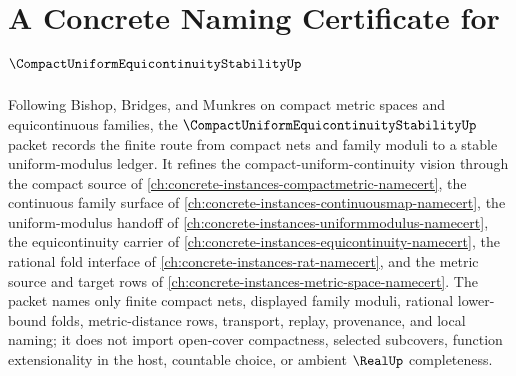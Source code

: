 \chapter{A Concrete Naming Certificate for $\CompactUniformEquicontinuityStabilityUp$}
\label{ch:concrete-instances-compact-uniform-equicontinuity-stability-namecert}

Following Bishop, Bridges, and Munkres on compact metric spaces and equicontinuous families, the $\CompactUniformEquicontinuityStabilityUp$ packet records the finite route from compact nets and family moduli to a stable uniform-modulus ledger. It refines the compact-uniform-continuity vision through the compact source of \autoref{ch:concrete-instances-compactmetric-namecert}, the continuous family surface of \autoref{ch:concrete-instances-continuousmap-namecert}, the uniform-modulus handoff of \autoref{ch:concrete-instances-uniformmodulus-namecert}, the equicontinuity carrier of \autoref{ch:concrete-instances-equicontinuity-namecert}, the rational fold interface of \autoref{ch:concrete-instances-rat-namecert}, and the metric source and target rows of \autoref{ch:concrete-instances-metric-space-namecert}. The packet names only finite compact nets, displayed family moduli, rational lower-bound folds, metric-distance rows, transport, replay, provenance, and local naming; it does not import open-cover compactness, selected subcovers, function extensionality in the host, countable choice, or ambient $\RealUp$ completeness.

